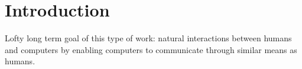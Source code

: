 \chapter{Introduction}



Lofty long term goal of this type of work:
natural interactions between humans and computers
by enabling computers to communicate through
similar means as humans.
